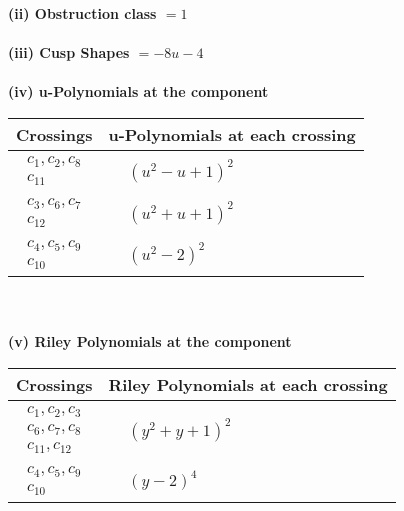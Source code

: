 \documentclass[1p]{elsarticle_modified}
\theoremstyle{definition}
\begin{document}
\flushleft \textbf{(ii) Obstruction class $= 1$}\\~\\
\flushleft \textbf{(iii) Cusp Shapes $= -8 u-4$}\\~\\
\newpage\renewcommand{\arraystretch}{1}
\flushleft \textbf{(iv) u-Polynomials at the component}\newline \\
\begin{tabular}{m{50pt}|m{274pt}}
Crossings & \hspace{64pt}u-Polynomials at each crossing \\
\hline $$\begin{aligned}c_{1},c_{2},c_{8}\\c_{11}\end{aligned}$$&$\begin{aligned}
&(u^2- u+1)^2
\end{aligned}$\\
\hline $$\begin{aligned}c_{3},c_{6},c_{7}\\c_{12}\end{aligned}$$&$\begin{aligned}
&(u^2+u+1)^2
\end{aligned}$\\
\hline $$\begin{aligned}c_{4},c_{5},c_{9}\\c_{10}\end{aligned}$$&$\begin{aligned}
&(u^2-2)^2
\end{aligned}$\\
\hline
\end{tabular}\\~\\
\newpage\renewcommand{\arraystretch}{1}
\flushleft \textbf{(v) Riley Polynomials at the component}\newline \\
\begin{tabular}{m{50pt}|m{274pt}}
Crossings & \hspace{64pt}Riley Polynomials at each crossing \\
\hline $$\begin{aligned}c_{1},c_{2},c_{3}\\c_{6},c_{7},c_{8}\\c_{11},c_{12}\end{aligned}$$&$\begin{aligned}
&(y^2+y+1)^2
\end{aligned}$\\
\hline $$\begin{aligned}c_{4},c_{5},c_{9}\\c_{10}\end{aligned}$$&$\begin{aligned}
&(y-2)^4
\end{aligned}$\\
\hline
\end{tabular}\\~\\
\end{document}
